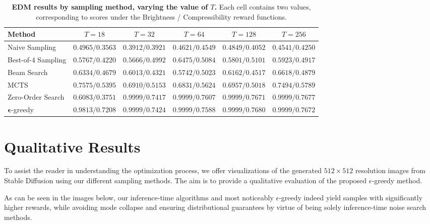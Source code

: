 \documentclass{article}
\begin{document}
\begin{table}
  \centering
  \caption{\small \textbf{EDM results by sampling method, varying the value of $T$.} Each cell contains two values, corresponding to scores under the Brightness / Compressibility reward functions.}
  \label{tab:edm_T}
  \setlength{\tabcolsep}{4pt}   %
    \renewcommand{\arraystretch}{1.05}
    \small
  \begin{tabular}{lccccc}
    \toprule
    \textbf{Method} & ${T=18}$ & ${T=32}$ & ${T=64}$ & ${T=128}$ & ${T=256}$ \\
    \midrule
    Naive Sampling     & $0.4965 / 0.3563$ & $0.3912 / 0.3921$ & $0.4621 / 0.4549$ & $0.4849 / 0.4052$ & $0.4541 / 0.4250$ \\
    Best-of-4 Sampling & $0.5767 / 0.4220$ & $0.5666 / 0.4992$ & $0.6475 / 0.5084$ & $0.5801 / 0.5101$ & $0.5923 / 0.4917$ \\
    Beam Search        & $0.6334 / 0.4679$ & $0.6013 / 0.4321$ & $0.5742 / 0.5023$ & $0.6162 / 0.4517$ & $0.6618 / 0.4879$ \\
    MCTS               & $0.7575 / 0.5395$ & $0.6910 / 0.5153$ & $0.6831 / 0.5624$ & $0.6957 / 0.5018$ & $0.7494 / 0.5789$ \\
    Zero-Order Search  & $0.6083 / 0.3751$ & $0.9999 / 0.7417$ & $0.9999 / \mathbf{0.7607}$ & $0.9999 / 0.7671$ & $0.9999 / \mathbf{0.7677}$ \\
    $\bm{\epsilon}$-greedy & $\mathbf{0.9813} / \mathbf{0.7208}$ & $\mathbf{0.9999} / \mathbf{0.7424}$ & $\mathbf{0.9999} / 0.7588$ & $\mathbf{0.9999} / \mathbf{0.7680}$ & $\mathbf{0.9999} / 0.7672$ \\
    \bottomrule
  \end{tabular}
\end{table}



\section{Qualitative Results}
\label{app:qual}

To assist the reader in understanding the optimization process, we offer visualizations of the generated $512\times 512$ resolution images from Stable Diffusion using our different sampling methods. The aim is to provide a qualitative evaluation of the proposed $\epsilon$-greedy method.

As can be seen in the images below, our inference-time algorithms and most noticeably $\epsilon$-greedy indeed yield samples with significantly higher rewards, while avoiding mode collapse and ensuring distributional guarantees by virtue of being solely inference-time noise search methods.
\end{document}
